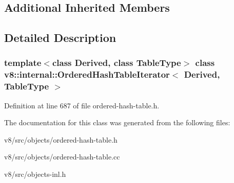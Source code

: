 \subsection*{Additional Inherited Members}


\subsection{Detailed Description}
\subsubsection*{template$<$class Derived, class Table\+Type$>$\newline
class v8\+::internal\+::\+Ordered\+Hash\+Table\+Iterator$<$ Derived, Table\+Type $>$}



Definition at line 687 of file ordered-\/hash-\/table.\+h.



The documentation for this class was generated from the following files\+:\begin{DoxyCompactItemize}
\item 
v8/src/objects/ordered-\/hash-\/table.\+h\item 
v8/src/objects/ordered-\/hash-\/table.\+cc\item 
v8/src/objects-\/inl.\+h\end{DoxyCompactItemize}
